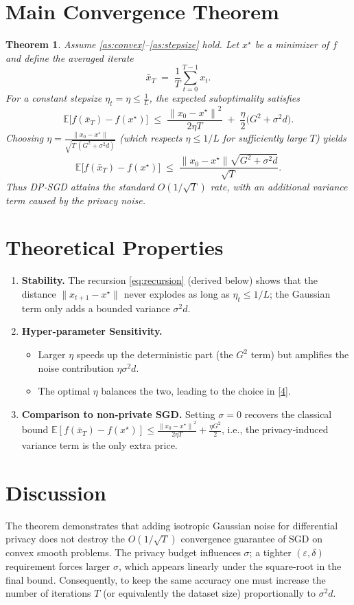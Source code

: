 \documentclass{article}
\newtheorem{theorem}{Theorem}
\newcommand{\EE}{\mathbb{E}}
\newcommand{\norm}[1]{\left\|#1\right\|}
\begin{document}
\section*{Main Convergence Theorem}
\begin{theorem}\label{thm:main}
Assume \ref{as:convex}–\ref{as:stepsize} hold. Let $x^\star$ be a minimizer of $f$ and define the averaged iterate
\[
\bar x_T \;=\;\frac{1}{T}\sum_{t=0}^{T-1} x_t .
\]
For a constant stepsize $\eta_t=\eta\le\frac{1}{L}$, the expected suboptimality satisfies
\[
\EE\!\bigl[f(\bar x_T)-f(x^\star)\bigr]
\;\le\;
\frac{\norm{x_0-x^\star}^2}{2\eta T}
\;+\;
\frac{\eta}{2}\bigl(G^2+\sigma^2 d\bigr).
\tag{3}
\]
Choosing $\eta=\frac{\norm{x_0-x^\star}}{\sqrt{T\,(G^2+\sigma^2 d)}}$ (which respects $\eta\le 1/L$ for sufficiently large $T$) yields
\[
\EE\!\bigl[f(\bar x_T)-f(x^\star)\bigr]
\;\le\;
\frac{\norm{x_0-x^\star}\sqrt{G^2+\sigma^2 d}}{\sqrt{T}} .
\tag{4}
\]
Thus DP‑SGD attains the standard $O(1/\sqrt{T})$ rate, with an additional variance term caused by the privacy noise.
\end{theorem}

\section*{Theoretical Properties}
\begin{enumerate}[label=\arabic*.]
\item \textbf{Stability.} The recursion \eqref{eq:recursion} (derived below) shows that the distance $\|x_{t+1}-x^\star\|$ never explodes as long as $\eta_t\le1/L$; the Gaussian term only adds a bounded variance $\sigma^2 d$.
\item \textbf{Hyper‑parameter Sensitivity.}
    \begin{itemize}
        \item Larger $\eta$ speeds up the deterministic part (the $G^2$ term) but amplifies the noise contribution $\eta\sigma^2 d$.
        \item The optimal $\eta$ balances the two, leading to the choice in \eqref{4}.
    \end{itemize}
\item \textbf{Comparison to non‑private SGD.} Setting $\sigma=0$ recovers the classical bound
    $\EE[f(\bar x_T)-f(x^\star)]\le \frac{\norm{x_0-x^\star}^2}{2\eta T}+\frac{\eta G^2}{2}$,
    i.e., the privacy‑induced variance term is the only extra price.
\end{enumerate}

\section*{Discussion}
The theorem demonstrates that adding isotropic Gaussian noise for differential privacy does not destroy the $O(1/\sqrt{T})$ convergence guarantee of SGD on convex smooth problems. The privacy budget influences $\sigma$; a tighter $(\varepsilon,\delta)$ requirement forces larger $\sigma$, which appears linearly under the square‑root in the final bound. Consequently, to keep the same accuracy one must increase the number of iterations $T$ (or equivalently the dataset size) proportionally to $\sigma^2 d$.
\end{document}
